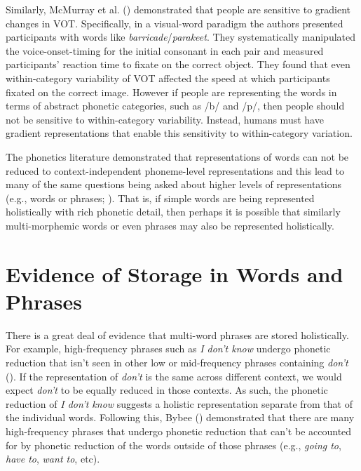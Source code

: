 \documentclass[
  12pt,
  letterpaper,
]{scrreport}
\begin{document}
Similarly, McMurray et al.
() demonstrated
that people are sensitive to gradient changes in VOT. Specifically, in a
visual-word paradigm the authors presented participants with words like
\emph{barricade}/\emph{parakeet}. They systematically manipulated the
voice-onset-timing for the initial consonant in each pair and measured
participants' reaction time to fixate on the correct object. They found
that even within-category variability of VOT affected the speed at which
participants fixated on the correct image. However if people are
representing the words in terms of abstract phonetic categories, such as
/b/ and /p/, then people should not be sensitive to within-category
variability. Instead, humans must have gradient representations that
enable this sensitivity to within-category variation.

The phonetics literature demonstrated that representations of words can
not be reduced to context-independent phoneme-level representations and
this lead to many of the same questions being asked about higher levels
of representations (e.g., words or phrases;
). That is, if simple words are
being represented holistically with rich phonetic detail, then perhaps
it is possible that similarly multi-morphemic words or even phrases may
also be represented holistically.

\section{Evidence of Storage in Words and
Phrases}\label{sec-evidence-of-storage-in-words-and-phrases}

There is a great deal of evidence that multi-word phrases are stored
holistically. For example, high-frequency phrases such as \emph{I don't
know} undergo phonetic reduction that isn't seen in other low or
mid-frequency phrases containing \emph{don't}
().
If the representation of \emph{don't} is the same across different
context, we would expect \emph{don't} to be equally reduced in those
contexts. As such, the phonetic reduction of \emph{I don't know}
suggests a holistic representation separate from that of the individual
words. Following this, Bybee ()
demonstrated that there are many high-frequency phrases that undergo
phonetic reduction that can't be accounted for by phonetic reduction of
the words outside of those phrases (e.g., \emph{going to}, \emph{have
to}, \emph{want to}, etc).
\end{document}
